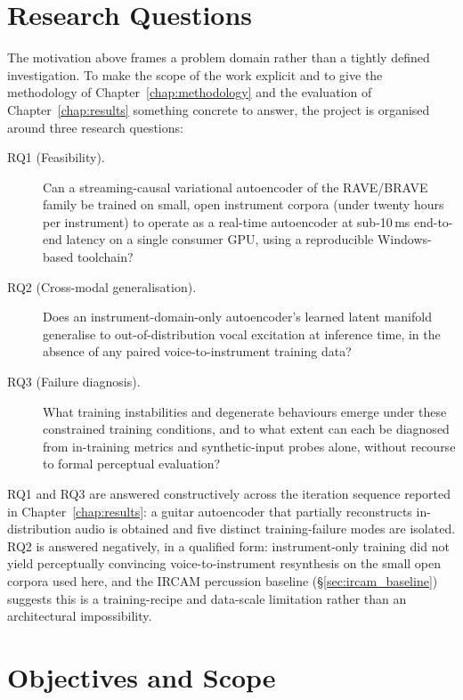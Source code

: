 \documentclass[a4paper,11pt,oneside,openany]{book}
\begin{document}
\section{Research Questions}\label{sec:research_questions}

The motivation above frames a problem domain rather than a tightly defined investigation. To make the scope of the work explicit and to give the methodology of Chapter~\ref{chap:methodology} and the evaluation of Chapter~\ref{chap:results} something concrete to answer, the project is organised around three research questions:

\begin{description}
\item[RQ1 \textnormal{(Feasibility).}] Can a streaming-causal variational autoencoder of the RAVE/BRAVE family be trained on small, open instrument corpora (under twenty hours per instrument) to operate as a real-time autoencoder at sub-10\,ms end-to-end latency on a single consumer GPU, using a reproducible Windows-based toolchain?
\item[RQ2 \textnormal{(Cross-modal generalisation).}] Does an instrument-domain-only autoencoder's learned latent manifold generalise to out-of-distribution vocal excitation at inference time, in the absence of any paired voice-to-instrument training data?
\item[RQ3 \textnormal{(Failure diagnosis).}] What training instabilities and degenerate behaviours emerge under these constrained training conditions, and to what extent can each be diagnosed from in-training metrics and synthetic-input probes alone, without recourse to formal perceptual evaluation?
\end{description}

RQ1 and RQ3 are answered constructively across the iteration sequence reported in Chapter~\ref{chap:results}: a guitar autoencoder that partially reconstructs in-distribution audio is obtained and five distinct training-failure modes are isolated. RQ2 is answered negatively, in a qualified form: instrument-only training did not yield perceptually convincing voice-to-instrument resynthesis on the small open corpora used here, and the IRCAM percussion baseline (\S\ref{sec:ircam_baseline}) suggests this is a training-recipe and data-scale limitation rather than an architectural impossibility.

\section{Objectives and Scope}\label{sec:objectives}
\end{document}
